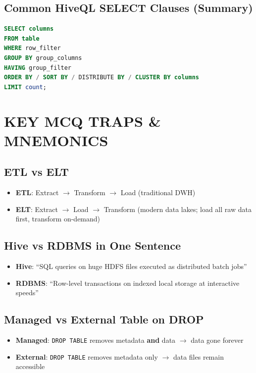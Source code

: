 \documentclass[11pt, onecolumn, a4paper]{article}
\begin{document}
\subsection{Common HiveQL SELECT Clauses (Summary)}

\begin{lstlisting}[language=SQL]
SELECT columns
FROM table
WHERE row_filter
GROUP BY group_columns
HAVING group_filter
ORDER BY / SORT BY / DISTRIBUTE BY / CLUSTER BY columns
LIMIT count;
\end{lstlisting}

\newpage
\section{KEY MCQ TRAPS \& MNEMONICS}

\subsection{ETL vs ELT}

\begin{itemize}
  \item \textbf{ETL}: Extract $\rightarrow$ Transform $\rightarrow$ Load (traditional DWH)
  \item \textbf{ELT}: Extract $\rightarrow$ Load $\rightarrow$ Transform (modern data lakes; load all raw data first, transform on-demand)
\end{itemize}

\subsection{Hive vs RDBMS in One Sentence}

\begin{itemize}
  \item \textbf{Hive}: ``SQL queries on huge HDFS files executed as distributed batch jobs''
  \item \textbf{RDBMS}: ``Row-level transactions on indexed local storage at interactive speeds''
\end{itemize}

\subsection{Managed vs External Table on DROP}

\begin{itemize}
  \item \textbf{Managed}: \texttt{DROP TABLE} removes metadata \textbf{and} data $\rightarrow$ data gone forever
  \item \textbf{External}: \texttt{DROP TABLE} removes metadata only $\rightarrow$ data files remain accessible
\end{itemize}
\end{document}
